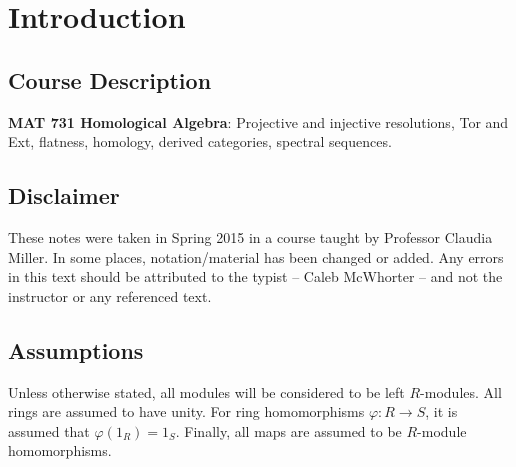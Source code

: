 \newpage
\section{Introduction}

\subsection{Course Description}

\textbf{MAT 731 Homological Algebra}: Projective and injective resolutions, Tor and Ext, flatness, homology, derived categories, spectral sequences.

\subsection{Disclaimer}

These notes were taken in Spring 2015 in a course taught by Professor Claudia Miller. In some places, notation/material has been changed or added. Any errors in this text should be attributed to the typist -- Caleb McWhorter -- and not the instructor or any referenced text. 

\subsection{Assumptions}

Unless otherwise stated, all modules will be considered to be left $R$-modules. All rings are assumed to have unity. For ring homomorphisms $\varphi: R \rightarrow S$, it is assumed that $\varphi(1_R)=1_S$. Finally, all maps are assumed to be $R$-module homomorphisms. 